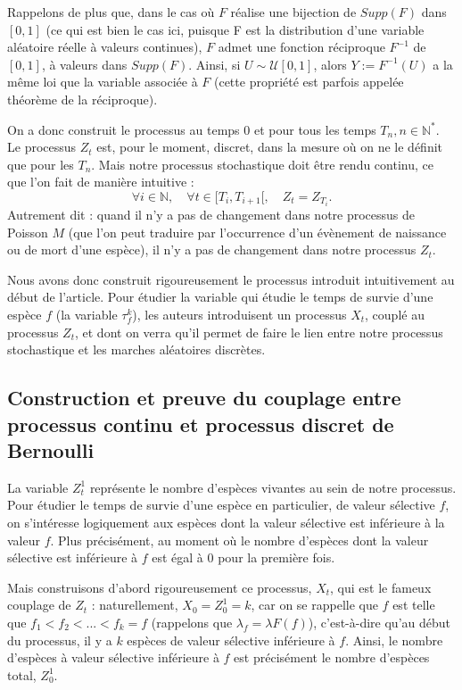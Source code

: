 \documentclass[12pt,a4paper]{article}
\begin{document}
Rappelons de plus que, dans le cas où $F$ réalise une bijection de $Supp(F)$ dans $[0,1]$ (ce qui est bien le cas ici, puisque F est la distribution d'une variable aléatoire réelle à valeurs continues), $F$ admet une fonction réciproque $F^{-1}$ de $[0,1]$, à valeurs dans $Supp(F)$. Ainsi, si $U \sim \mathcal{U}[0,1]$, alors $Y:= F^{-1}(U)$ a la même loi que la variable associée à $F$ (cette propriété est parfois appelée théorème de la réciproque). 

On a donc construit le processus au temps $0$ et pour tous les temps $T_n, n \in \mathbb{N}^*$. Le processus $Z_t$ est, pour le moment, discret, dans la mesure où on ne le définit que pour les $T_n$. Mais notre processus stochastique doit être rendu continu, ce que l'on fait de manière intuitive : $$ \forall i \in \mathbb{N}, \quad \forall t \in [T_i, T_{i+1}[, \quad Z_t = Z_{T_{i}}. $$ Autrement dit : quand il n'y a pas de changement dans notre processus de Poisson $M$ (que l'on peut traduire  par l'occurrence d'un évènement de naissance ou de mort d'une espèce), il n'y a pas de changement dans notre processus $Z_t$.\par

Nous avons donc construit rigoureusement le processus introduit intuitivement au début de l'article. Pour étudier la variable qui étudie le temps de survie d'une espèce $f$ (la variable $\tau_f^k$), les auteurs introduisent un processus $X_t$, couplé au processus $Z_t$, et dont on verra qu'il permet de faire le lien entre notre processus stochastique et les marches aléatoires discrètes.  \par

\subsection[Couplage continu-discret]{Construction et preuve du couplage entre processus continu et processus discret de Bernoulli}

La variable $Z_t^1$ représente le nombre d'espèces vivantes au sein de notre processus. Pour étudier le temps de survie d'une espèce en particulier, de valeur sélective $f$, on s'intéresse logiquement aux espèces dont la valeur sélective est inférieure à la valeur $f$. Plus précisément, au moment où le nombre d'espèces dont la valeur sélective est inférieure à $f$ est égal à 0 pour la première fois. \par 

Mais construisons d'abord rigoureusement ce processus, $X_t$, qui est le fameux couplage de $Z_t$ : naturellement, $X_0 = Z_0^1 = k$, car on se rappelle que $f$ est telle que $f_1 < f_2 < ... < f_k = f$ (rappelons que $\lambda_f = \lambda F(f)$), c'est-à-dire qu'au début du processus, il y a $k$ espèces de valeur sélective inférieure à $f$. Ainsi, le nombre d'espèces à valeur sélective inférieure à $f$ est précisément le nombre d'espèces total, $Z_0^1$. \par 
\end{document}
